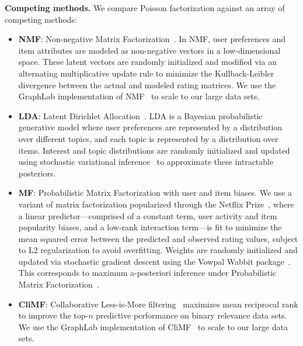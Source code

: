 {\bf Competing methods.} We compare Poisson factorization against an array of
competing methods:
\begin{itemize}
  \item {\bf NMF}: Non-negative Matrix
    Factorization~\cite{Lee:1999}. In NMF, user preferences and item
    attributes are modeled as non-negative vectors in a
    low-dimensional space. These latent vectors are randomly
    initialized and modified via an alternating multiplicative update
    rule to minimize the Kullback-Leibler divergence between the
    actual and modeled rating matrices. We use the GraphLab
    implementation of NMF~\cite{kyrola2012graphchi} to scale to our
    large data sets.

  \item {\bf LDA}: Latent Dirichlet Allocation~\cite{Blei:2003b}. LDA
    is a Bayesian probabilistic generative model where user preferences
    are represented by a distribution over different topics, and each
    topic is represented by a distribution over items. Interest and topic
    distributions are randomly initialized and updated using
    stochastic variational inference~\cite{Hoffman:2013} to
    approximate these intractable posteriors.

  \item {\bf MF}: Probabilistic Matrix Factorization with user and
    item biases. We use a variant of matrix factorization popularized
    through the Netflix Prize~\cite{Koren:2009}, where a linear
    predictor---comprised of a constant term, user activity and item
    popularity biases, and a low-rank interaction term---is fit to
    minimize the mean squared error between the predicted and observed
    rating values, subject to L2 regularization to avoid
    overfitting. Weights are randomly initialized and updated via
    stochastic gradient descent using the Vowpal Wabbit package~\cite{Weinberger:2009}. This
    corresponds to maximum a-posteriori inference under Probabilistic
    Matrix Factorization~\cite{Salakhutdinov:2008a}.

\item {\bf CliMF}: Collaborative Less-is-More
  filtering~\cite{shi2012climf} maximizes mean reciprocal rank to
  improve the top-$n$ predictive performance on binary relevance data
  sets. We use the GraphLab implementation of
  CliMF~\cite{kyrola2012graphchi} to scale to our large data sets.
\end{itemize}

